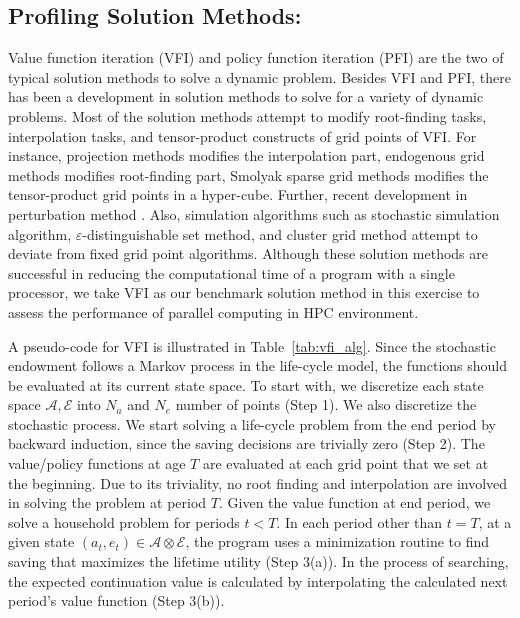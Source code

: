 \documentclass[12pt]{article}
\begin{document}
\subsection{Profiling Solution Methods:}
Value function iteration (VFI) and policy function iteration (PFI) are the two of typical solution methods to solve a dynamic problem. Besides VFI and PFI, there has been a development in solution methods to solve for a variety of dynamic problems. Most of the solution methods attempt to modify root-finding tasks, interpolation tasks, and tensor-product constructs of grid points of VFI. For instance, projection methods \citep{Judd-92} modifies the interpolation part, endogenous grid methods \citep{Carroll-05} modifies root-finding part, Smolyak sparse grid methods \citep{Krueger-Kubler-04} modifies the tensor-product grid points in a hyper-cube. Further, recent development in perturbation method \citep{Judd-Guu-97}.
Also, simulation algorithms such as stochastic simulation algorithm, $\varepsilon$-distinguishable set method, and cluster grid method attempt to deviate from fixed grid point algorithms. Although these solution methods are successful in reducing the computational time of a program with a single processor, we take VFI as our benchmark solution method in this exercise to assess the performance of parallel computing in HPC environment.

A pseudo-code for VFI is illustrated in Table~\ref{tab:vfi_alg}. Since the stochastic endowment follows a Markov process in the life-cycle model, the functions should be evaluated at its current state space. To start with, we discretize each state space $\mathcal{A}, \mathcal{E}$ into $N_a$ and $N_e$ number of points (Step 1). We also discretize the stochastic process. We start solving a life-cycle problem from the end period by backward induction, since the saving decisions are trivially zero (Step 2). The value/policy functions at age $T$ are evaluated at each grid point that we set at the beginning. Due to its triviality, no root finding and interpolation are involved in solving the problem at period $T$. Given the value function at end period, we solve a household problem for periods $t<T$. In each period other than $t=T$, at a given state $(a_t,e_t)\in\mathcal{A} \otimes \mathcal{E}$, the program uses a minimization routine to find saving that maximizes the lifetime utility (Step 3(a)). In the process of searching, the expected continuation value is calculated by interpolating the calculated next period's value function (Step 3(b)). 
\end{document}
